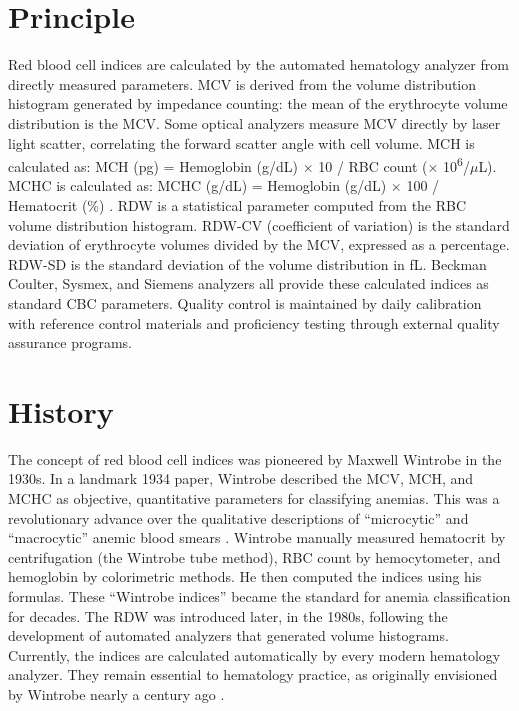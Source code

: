 \section*{Principle}
Red blood cell indices are calculated by the automated hematology analyzer from directly measured parameters. MCV is derived from the volume distribution histogram generated by impedance counting: the mean of the erythrocyte volume distribution is the MCV. Some optical analyzers measure MCV directly by laser light scatter, correlating the forward scatter angle with cell volume. MCH is calculated as: MCH (pg) = Hemoglobin (g/dL)  $\times$ 10 /  RBC count  ($\times$ 10\textsuperscript{6}/$\mu$L). MCHC is calculated as: MCHC (g/dL) = Hemoglobin (g/dL)  $\times$ 100 /  Hematocrit (\%) . \cite{tietz2012textbook} RDW is a statistical parameter computed from the RBC volume distribution histogram. RDW-CV (coefficient of variation) is the standard deviation of erythrocyte volumes divided by the MCV, expressed as a percentage. RDW-SD is the standard deviation of the volume distribution in fL. Beckman Coulter, Sysmex, and Siemens analyzers all provide these calculated indices as standard CBC parameters. Quality control is maintained by daily calibration with reference control materials and proficiency testing through external quality assurance programs.

\section*{History}
The concept of red blood cell indices was pioneered by Maxwell Wintrobe in the 1930s. In a landmark 1934 paper, Wintrobe described the MCV, MCH, and MCHC as objective, quantitative parameters for classifying anemias. This was a revolutionary advance over the qualitative descriptions of ``microcytic'' and ``macrocytic'' anemic blood smears \cite{wintrobe1934anemia}. Wintrobe manually measured hematocrit by centrifugation (the Wintrobe tube method), RBC count by hemocytometer, and hemoglobin by colorimetric methods. He then computed the indices using his formulas. These ``Wintrobe indices'' became the standard for anemia classification for decades. The RDW was introduced later, in the 1980s, following the development of automated analyzers that generated volume histograms. Currently, the indices are calculated automatically by every modern hematology analyzer. They remain essential to hematology practice, as originally envisioned by Wintrobe nearly a century ago \cite{brugnara2013red}.

